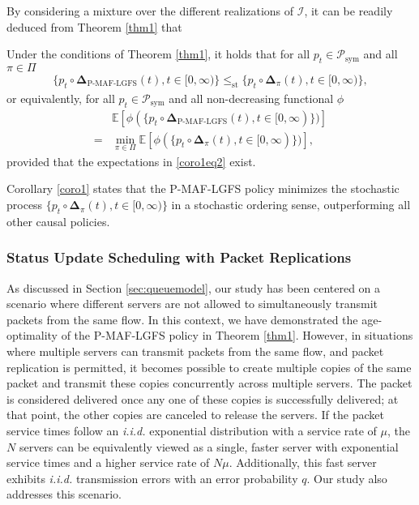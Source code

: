 By considering a mixture over the different realizations of $\mathcal{I}$, it can be readily deduced from Theorem \ref{thm1} that 
\begin{corollary}\label{coro1}
Under the conditions of Theorem \ref{thm1}, it holds that for all $p_t \in\mathcal{P}_{\text{sym}}$ and all $\pi\in\Pi$ 
\begin{align}\label{coro1eq1}
\{p_t \circ\bm{\Delta}_{\text{P-MAF-LGFS}}(t), t\in [0,\infty)\} \!\leq_{\text{st}} \!\{p_t \circ\bm{\Delta}_\pi(t), t\in [0,\infty)\}, 
\end{align}
or equivalently, for all $p_t \in\mathcal{P}_{\text{sym}}$ and all non-decreasing functional $\phi$
 \begin{align}\label{coro1eq2}
&\mathbb{E}\left[\phi (\{p_t \circ\bm{\Delta}_{\text{P-MAF-LGFS}}(t),t\in [0,\infty)\})\right] \nonumber\\
= & \min_{\pi\in\Pi} \mathbb{E}\left[\phi (\{p_t \circ\bm{\Delta}_\pi(t),t\in [0,\infty)\})\right],
\end{align}
provided that the expectations in \eqref{coro1eq2} exist.
\end{corollary}

Corollary \ref{coro1} states that the P-MAF-LGFS policy minimizes the stochastic process $\{p_t \circ\bm{\Delta}_\pi(t), t\in [0,\infty)\}$ in a stochastic ordering sense, outperforming all other causal policies.

\subsubsection{Status Update Scheduling with Packet Replications}

As discussed in Section \ref{sec:queuemodel}, our study has been centered on a scenario where different servers are not allowed to simultaneously transmit packets from the same flow. In this context, we have demonstrated the age-optimality of the P-MAF-LGFS policy in Theorem \ref{thm1}. However, in situations where multiple servers can transmit packets from the same flow, and packet replication is permitted, it becomes possible to create multiple copies of the same packet and transmit these copies concurrently across multiple servers. The packet is considered delivered once any one of these copies is successfully delivered; at that point, the other copies are canceled to release the servers. If the packet service times follow an \emph{i.i.d.} exponential distribution with a service rate of $\mu$, the $N$ servers can be equivalently viewed as a single, faster server with exponential service times and a higher service rate of $N\mu$. Additionally, this fast server exhibits \emph{i.i.d.} transmission errors with an error probability $q$. Our study also addresses this scenario. 


